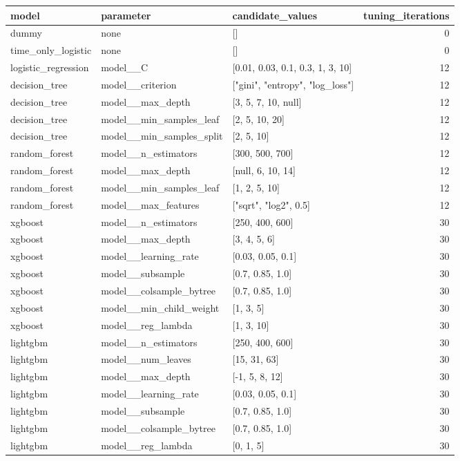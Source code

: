 \begin{tabular}{lllr}
\toprule
model & parameter & candidate\_values & tuning\_iterations \\
\midrule
dummy & none & [] & 0 \\
time\_only\_logistic & none & [] & 0 \\
logistic\_regression & model\_\_C & [0.01, 0.03, 0.1, 0.3, 1, 3, 10] & 12 \\
decision\_tree & model\_\_criterion & ["gini", "entropy", "log\_loss"] & 12 \\
decision\_tree & model\_\_max\_depth & [3, 5, 7, 10, null] & 12 \\
decision\_tree & model\_\_min\_samples\_leaf & [2, 5, 10, 20] & 12 \\
decision\_tree & model\_\_min\_samples\_split & [2, 5, 10] & 12 \\
random\_forest & model\_\_n\_estimators & [300, 500, 700] & 12 \\
random\_forest & model\_\_max\_depth & [null, 6, 10, 14] & 12 \\
random\_forest & model\_\_min\_samples\_leaf & [1, 2, 5, 10] & 12 \\
random\_forest & model\_\_max\_features & ["sqrt", "log2", 0.5] & 12 \\
xgboost & model\_\_n\_estimators & [250, 400, 600] & 30 \\
xgboost & model\_\_max\_depth & [3, 4, 5, 6] & 30 \\
xgboost & model\_\_learning\_rate & [0.03, 0.05, 0.1] & 30 \\
xgboost & model\_\_subsample & [0.7, 0.85, 1.0] & 30 \\
xgboost & model\_\_colsample\_bytree & [0.7, 0.85, 1.0] & 30 \\
xgboost & model\_\_min\_child\_weight & [1, 3, 5] & 30 \\
xgboost & model\_\_reg\_lambda & [1, 3, 10] & 30 \\
lightgbm & model\_\_n\_estimators & [250, 400, 600] & 30 \\
lightgbm & model\_\_num\_leaves & [15, 31, 63] & 30 \\
lightgbm & model\_\_max\_depth & [-1, 5, 8, 12] & 30 \\
lightgbm & model\_\_learning\_rate & [0.03, 0.05, 0.1] & 30 \\
lightgbm & model\_\_subsample & [0.7, 0.85, 1.0] & 30 \\
lightgbm & model\_\_colsample\_bytree & [0.7, 0.85, 1.0] & 30 \\
lightgbm & model\_\_reg\_lambda & [0, 1, 5] & 30 \\

\end{tabular}
